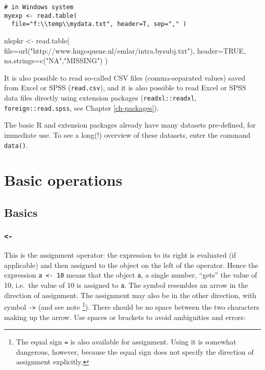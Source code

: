 \documentclass[
]{book}
\newenvironment{Shaded}{\begin{snugshade}}{\end{snugshade}}
\newcommand{\AttributeTok}[1]{\textcolor[rgb]{0.77,0.63,0.00}{#1}}
\newcommand{\ConstantTok}[1]{\textcolor[rgb]{0.00,0.00,0.00}{#1}}
\newcommand{\FunctionTok}[1]{\textcolor[rgb]{0.00,0.00,0.00}{#1}}
\newcommand{\NormalTok}[1]{#1}
\newcommand{\OtherTok}[1]{\textcolor[rgb]{0.56,0.35,0.01}{#1}}
\newcommand{\StringTok}[1]{\textcolor[rgb]{0.31,0.60,0.02}{#1}}
\begin{document}
\begin{verbatim}
# in Windows system
myexp <- read.table(
  file="f:\\temp\\mydata.txt", header=T, sep="," )
\end{verbatim}

\begin{Shaded}
\begin{Highlighting}[]
\NormalTok{nlspkr }\OtherTok{\textless{}{-}} \FunctionTok{read.table}\NormalTok{(}
  \AttributeTok{file=}\FunctionTok{url}\NormalTok{(}\StringTok{"http://www.hugoquene.nl/emlar/intra.bysubj.txt"}\NormalTok{),}
  \AttributeTok{header=}\ConstantTok{TRUE}\NormalTok{, }\AttributeTok{na.strings=}\FunctionTok{c}\NormalTok{(}\StringTok{"NA"}\NormalTok{,}\StringTok{"MISSING"}\NormalTok{) )}
\end{Highlighting}
\end{Shaded}

It is also possible to read so-called CSV files (comma-separated values) saved from Excel or SPSS (\texttt{read.csv}), and it is also possible to read Excel or SPSS data files directly using extension packages (\texttt{readxl::readxl}, \texttt{foreign::read.spss}, see Chapter \ref{ch-packages}).

The basic R and extension packages already have many
datasets pre-defined, for immediate use.
To see a long(!) overview of these datasets, enter the command \texttt{data()}.

\hypertarget{ch-basicoperations}{%
\chapter{Basic operations}\label{ch-basicoperations}}

\hypertarget{sub:basics}{%
\section{Basics}\label{sub:basics}}

\hypertarget{section}{%
\subsection{\texorpdfstring{\texttt{\textless{}-}}{\textless-}}\label{section}}

This is the assignment operator: the expression to its right is
evaluated (if applicable) and then assigned to the object on the
left of the operator. Hence the expression
\texttt{a\ \textless{}-\ 10} means that the object \texttt{a}, a single
number, ``gets'' the value of 10, i.e.~the value of 10 is assigned to \texttt{a}.
The symbol resembles
an arrow in the direction of assignment. The assignment may also be
in the other direction, with symbol \texttt{-\textgreater{}} (and see note
\footnote{The equal sign \texttt{=} is also available for assignment. Using
  it is somewhat dangerous, however, because the equal sign does not
  specify the direction of assignment explicitly.}).
There should be no space between the two characters making up the arrow.
Use spaces or brackets to avoid ambiguities and errors:
\end{document}
